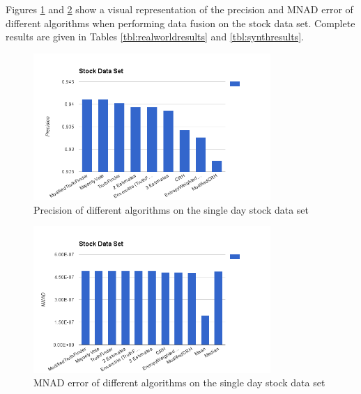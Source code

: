 \documentclass{acm_proc_article-sp}
\begin{document}
Figures \ref{fig:precision} and \ref{fig:mnad} show a visual representation of the precision and MNAD error of different algorithms when performing data fusion on the stock data set. Complete results are given in Tables \ref{tbl:realworldresults} and \ref{tbl:synthresults}.



\begin{figure}
\centering
\includegraphics[width=9cm]{StockPrecision.png}
\caption{Precision of different algorithms on the single day stock data set}
\label{fig:precision}
\end{figure}


\begin{figure}
\centering
\includegraphics[width=9cm]{StockMNAD.png}
\caption{MNAD error of different algorithms on the single day stock data set}
\label{fig:mnad}
\end{figure}
\end{document}
